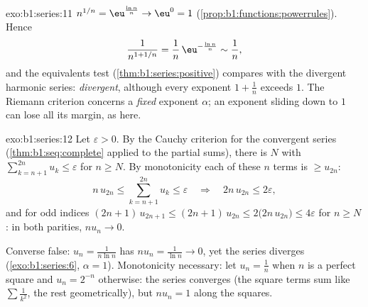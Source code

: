 \begin{solution}{exo:b1:series:11}
$n^{1/n} = \eu^{\frac{\ln n}{n}} \to \eu^0 = 1$
(\cref{prop:b1:functions:powerrules}). Hence
\[
\frac{1}{n^{1 + 1/n}} = \frac{1}{n}\,\eu^{-\frac{\ln n}{n}}
\sim \frac{1}{n} ,
\]
and the equivalents test (\cref{thm:b1:series:positive})
compares with the divergent harmonic series: \emph{divergent},
although every exponent $1 + \frac1n$ exceeds $1$. The Riemann
criterion concerns a \emph{fixed} exponent $\alpha$; an exponent
sliding down to $1$ can lose all its margin, as here.
\end{solution}

\begin{solution}{exo:b1:series:12}
Let $\varepsilon > 0$. By the Cauchy criterion for the
convergent series (\cref{thm:b1:seq:complete} applied to the
partial sums), there is $N$ with $\sum_{k=n+1}^{2n} u_k \leq
\varepsilon$ for $n \geq N$. By monotonicity each of these $n$
terms is $\geq u_{2n}$:
\[
n\,u_{2n} \leq \sum_{k=n+1}^{2n} u_k \leq \varepsilon
\quad\Longrightarrow\quad 2n\,u_{2n} \leq 2\varepsilon ,
\]
and for odd indices $(2n+1)\,u_{2n+1} \leq (2n+1)\,u_{2n} \leq
2\bigl(2n\,u_{2n}\bigr) \leq 4\varepsilon$ for $n \geq N$: in
both parities, $n u_n \to 0$.

Converse false: $u_n = \frac{1}{n\ln n}$ has $n u_n =
\frac{1}{\ln n} \to 0$, yet the series diverges
(\cref{exo:b1:series:6}, $\alpha = 1$). Monotonicity necessary:
let $u_n = \frac1n$ when $n$ is a perfect square and $u_n =
2^{-n}$ otherwise: the series converges (the square terms sum
like $\sum \frac{1}{k^2}$, the rest geometrically), but $n u_n =
1$ along the squares.
\end{solution}

